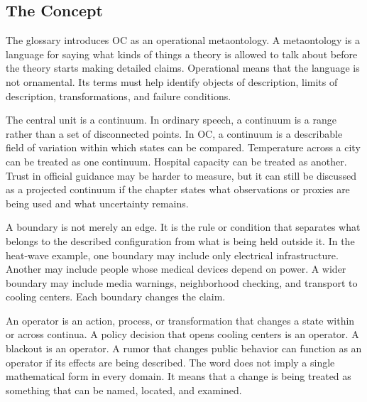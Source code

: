 \documentclass[11pt,a4paper,openany]{book}
\begin{document}
\subsection{The Concept}
The glossary introduces OC as an operational metaontology. A metaontology is a language for saying what kinds of things a theory is allowed to talk about before the theory starts making detailed claims. Operational means that the language is not ornamental. Its terms must help identify objects of description, limits of description, transformations, and failure conditions. \cite{raf_networks,bak_soc}\par
The central unit is a continuum. In ordinary speech, a continuum is a range rather than a set of disconnected points. In OC, a continuum is a describable field of variation within which states can be compared. Temperature across a city can be treated as one continuum. Hospital capacity can be treated as another. Trust in official guidance may be harder to measure, but it can still be discussed as a projected continuum if the chapter states what observations or proxies are being used and what uncertainty remains.\par
A boundary is not merely an edge. It is the rule or condition that separates what belongs to the described configuration from what is being held outside it. In the heat-wave example, one boundary may include only electrical infrastructure. Another may include people whose medical devices depend on power. A wider boundary may include media warnings, neighborhood checking, and transport to cooling centers. Each boundary changes the claim.\par
An operator is an action, process, or transformation that changes a state within or across continua. A policy decision that opens cooling centers is an operator. A blackout is an operator. A rumor that changes public behavior can function as an operator if its effects are being described. The word does not imply a single mathematical form in every domain. It means that a change is being treated as something that can be named, located, and examined.\par
\end{document}
